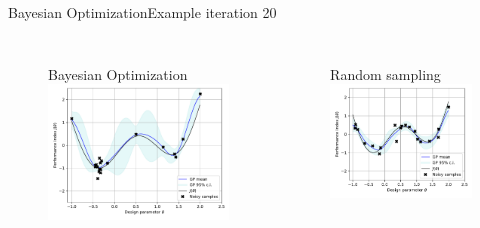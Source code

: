 \documentclass{beamer}
\begin{document}
\begin{frame}{Bayesian Optimization}{Example}
\centering
iteration 20
\begin{columns}
   \begin{figure}
   Bayesian Optimization
   \includegraphics[width=\textwidth]{img/BO/BO_fit_17.pdf}
   \end{figure}  
   \begin{figure}
 Random sampling
   \includegraphics[width=\textwidth]{img/GP_fit/GP_fit_20.pdf}
   \end{figure}  
\end{columns}
\end{frame}


\begin{frame}{}{}
\begin{center}
\huge{}
\end{center}
\end{frame}

	
\end{document}
